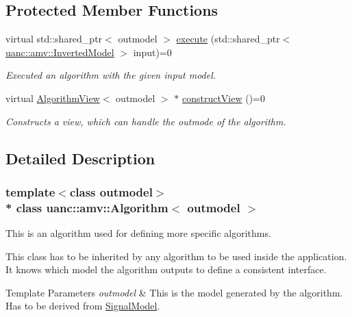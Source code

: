 \subsection*{Protected Member Functions}
\begin{DoxyCompactItemize}
\item 
virtual std\+::shared\+\_\+ptr$<$ outmodel $>$ \hyperlink{classuanc_1_1amv_1_1_algorithm_a3a0bd5e6e8cc1a3f9bd9d9b384e121b5}{execute} (std\+::shared\+\_\+ptr$<$ \hyperlink{classuanc_1_1amv_1_1_inverted_model}{uanc\+::amv\+::\+Inverted\+Model} $>$ input)=0
\begin{DoxyCompactList}\small\item\em Executed an algorithm with the given input model. \end{DoxyCompactList}\item 
virtual \hyperlink{classuanc_1_1amv_1_1_algorithm_view}{Algorithm\+View}$<$ outmodel $>$ $\ast$ \hyperlink{classuanc_1_1amv_1_1_algorithm_af5561072283ed19634893263c95a4b6e}{construct\+View} ()=0
\begin{DoxyCompactList}\small\item\em Constructs a view, which can handle the outmode of the algorithm. \end{DoxyCompactList}\end{DoxyCompactItemize}


\subsection{Detailed Description}
\subsubsection*{template$<$class outmodel$>$\\*
class uanc\+::amv\+::\+Algorithm$<$ outmodel $>$}

This is an algorithm used for defining more specific algorithms. 

This class has to be inherited by any algorithm to be used inside the application. It knows which model the algorithm outputs to define a consistent interface.


\begin{DoxyTemplParams}{Template Parameters}
{\em outmodel} & This is the model generated by the algorithm. Has to be derived from \hyperlink{classuanc_1_1amv_1_1_signal_model}{Signal\+Model}. \\
\hline
\end{DoxyTemplParams}


